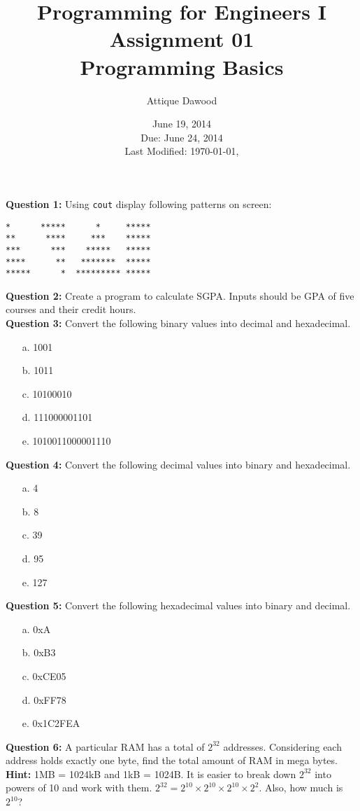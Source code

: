 \documentclass[12pt,a4paper]{article}
\title{Programming for Engineers I\\Assignment 01\\Programming Basics}
\author{Attique Dawood}
\date{June 19, 2014\\Due: June 24, 2014\\[0.2cm] Last Modified: \today, \currenttime}
\begin{document}
\maketitle
\noindent\textbf{Question 1:} Using \verb|cout| display following patterns on screen:
\begin{lstlisting}
*      *****      *     *****
**      ****     ***    *****
***      ***    *****   *****
****      **   *******  *****
*****      *  ********* *****
\end{lstlisting}
\noindent\textbf{Question 2:} Create a program to calculate SGPA. Inputs should be GPA of five courses and their credit hours.\\
\noindent\textbf{Question 3:} Convert the following binary values into decimal and hexadecimal.
\begin{enumerate}
\item[a.] 1001
\item[b.] 1011
\item[c.] 10100010
\item[d.] 111000001101
\item[e.] 1010011000001110
\end{enumerate}
\noindent\textbf{Question 4:} Convert the following decimal values into binary and hexadecimal.
\begin{enumerate}
\item[a.] 4
\item[b.] 8
\item[c.] 39
\item[d.] 95
\item[e.] 127
\end{enumerate}
\noindent\textbf{Question 5:} Convert the following hexadecimal values into binary and decimal.
\begin{enumerate}
\item[a.] 0xA
\item[b.] 0xB3
\item[c.] 0xCE05
\item[d.] 0xFF78
\item[e.] 0x1C2FEA
\end{enumerate}
\noindent\textbf{Question 6:} A particular RAM has a total of $2^{32}$ addresses. Considering each address holds exactly one byte, find the total amount of RAM in mega bytes.\\
\noindent\textbf{Hint:} 1MB = 1024kB and 1kB = 1024B. It is easier to break down $2^{32}$ into powers of 10 and work with them. $2^{32}=2^{10}\times 2^{10}\times 2^{10}\times 2^2$. Also, how much is $2^{10}$?\\
\end{document}
